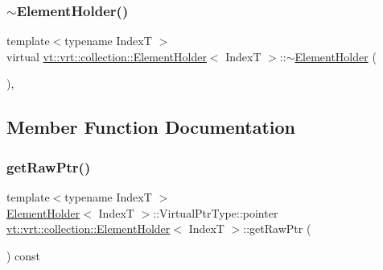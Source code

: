 \mbox{\label{structvt_1_1vrt_1_1collection_1_1_element_holder_a9f8f4304168ecb1a0b13f2b58a0abd0b}} 
\subsubsection{\texorpdfstring{$\sim$\+Element\+Holder()}{~ElementHolder()}}
{\footnotesize\ttfamily template$<$typename IndexT $>$ \\
virtual \hyperlink{structvt_1_1vrt_1_1collection_1_1_element_holder}{vt\+::vrt\+::collection\+::\+Element\+Holder}$<$ IndexT $>$\+::$\sim$\hyperlink{structvt_1_1vrt_1_1collection_1_1_element_holder}{Element\+Holder} (\begin{DoxyParamCaption}{ }\end{DoxyParamCaption})\hspace{0.3cm}{\ttfamily [virtual]}, {\ttfamily [default]}}



\subsection{Member Function Documentation}
\mbox{\label{structvt_1_1vrt_1_1collection_1_1_element_holder_a4fcba6438d97c525ff5f73d372a31133}} 
\subsubsection{\texorpdfstring{get\+Raw\+Ptr()}{getRawPtr()}}
{\footnotesize\ttfamily template$<$typename IndexT $>$ \\
\hyperlink{structvt_1_1vrt_1_1collection_1_1_element_holder}{Element\+Holder}$<$ IndexT $>$\+::Virtual\+Ptr\+Type\+::pointer \hyperlink{structvt_1_1vrt_1_1collection_1_1_element_holder}{vt\+::vrt\+::collection\+::\+Element\+Holder}$<$ IndexT $>$\+::get\+Raw\+Ptr (\begin{DoxyParamCaption}{ }\end{DoxyParamCaption}) const}



